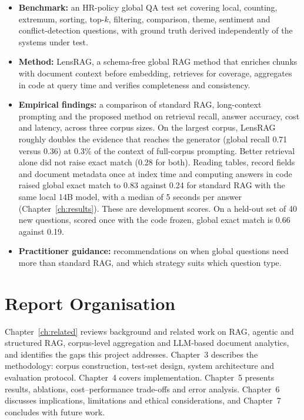 \documentclass[11pt,letterpaper,oneside]{report}
\begin{document}
\begin{itemize}
  \item \textbf{Benchmark:} an HR-policy global QA test set covering local,
  counting, extremum, sorting, top-$k$, filtering, comparison, theme,
  sentiment and conflict-detection questions, with ground truth derived
  independently of the systems under test.
  \item \textbf{Method:} LensRAG, a schema-free global RAG method that
  enriches chunks with document context before embedding, retrieves for
  coverage, aggregates in code at query time and verifies completeness and
  consistency.
  \item \textbf{Empirical findings:} a comparison of standard RAG,
  long-context prompting and the proposed method on retrieval recall,
  answer accuracy, cost and latency, across three corpus sizes. On the
  largest corpus, LensRAG roughly doubles the evidence that reaches the
  generator (global recall 0.71 versus 0.36) at 0.3\% of the context of
  full-corpus prompting. Better retrieval alone did not raise exact match
  (0.28 for both). Reading tables, record fields and document metadata once
  at index time and computing answers in code raised global exact match to
  0.83 against 0.24 for standard RAG with the same local 14B model, with a
  median of 5 seconds per answer (Chapter~\ref{ch:results}). These are
  development scores. On a held-out set of 40 new questions, scored once
  with the code frozen, global exact match is 0.66 against 0.19.
  \item \textbf{Practitioner guidance:} recommendations on when global
  questions need more than standard RAG, and which strategy suits which
  question type.
\end{itemize}

\section{Report Organisation}
\label{sec:organisation}

Chapter~\ref{ch:related} reviews background and related work on RAG,
agentic and structured RAG, corpus-level aggregation and LLM-based document
analytics, and identifies the gaps this project addresses. Chapter~3
describes the methodology: corpus construction, test-set design, system
architecture and evaluation protocol. Chapter~4 covers implementation.
Chapter~5 presents results, ablations, cost--performance trade-offs and
error analysis. Chapter~6 discusses implications, limitations and ethical
considerations, and Chapter~7 concludes with future work.
\end{document}
